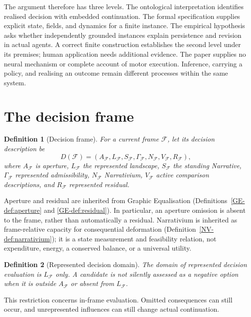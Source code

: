 \documentclass[11pt,a4paper]{article}
\newtheorem{definition}{Definition}[section]
\theoremstyle{remark}
\newcommand{\Frame}{\mathcal F}
\begin{document}
The argument therefore has three levels. The ontological interpretation
identifies realised decision with embedded continuation. The formal
specification supplies explicit state, fields, and dynamics for a finite
instance. The empirical hypothesis asks whether independently grounded
instances explain persistence and revision in actual agents. A correct finite
construction establishes the second level under its premises; human
application needs additional evidence. The paper supplies no neural mechanism
or complete account of motor execution. Inference, carrying a policy, and
realising an outcome remain different processes within the same system.

\section{The decision frame}\label{sec:frame}

\begin{definition}[Decision frame]\label{def:decision-frame}
For a current frame \(\Frame\), let its decision description be
\[
D(\Frame)=(A_{\Frame},L_{\Frame},S_{\Frame},\Gamma_{\Frame},N_{\Frame},V_{\Frame},R_{\Frame}),
\]
where \(A_{\Frame}\) is aperture, \(L_{\Frame}\) the represented landscape,
\(S_{\Frame}\) the standing Narrative, \(\Gamma_{\Frame}\) represented
admissibility, \(N_{\Frame}\) Narrativium, \(V_{\Frame}\) active comparison
descriptions, and \(R_{\Frame}\) represented residual.
\end{definition}

Aperture and residual are inherited from Graphic Equalisation
(Definitions~\ref{GE-def:aperture} and \ref{GE-def:residual}). In particular,
an aperture omission is absent to the frame, rather than automatically a
residual. Narrativium is inherited as frame-relative capacity for consequential
deformation (Definition~\ref{NV-def:narrativium}); it is a state measurement
and feasibility relation, not expenditure, energy, a conserved balance, or a
universal utility.

\begin{definition}[Represented decision domain]\label{def:domain}
The domain of represented decision evaluation is \(L_{\Frame}\) only. A candidate is not
silently assessed as a negative option when it is outside \(A_{\Frame}\) or
absent from \(L_{\Frame}\).
\end{definition}
This restriction concerns in-frame evaluation. Omitted consequences can still
occur, and unrepresented influences can still change actual continuation.
\end{document}
